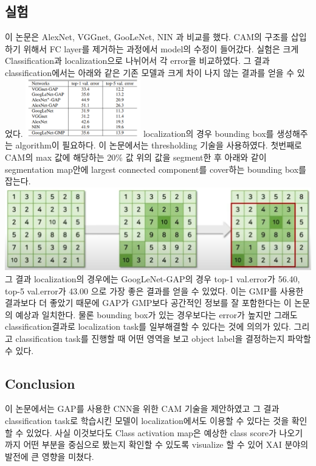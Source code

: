 \documentclass[extendedabs]{bmvc2k}
\begin{document}
 \subsection{실험}
 \quad 이 논문은 AlexNet, VGGnet, GooLeNet, NIN 과 비교를 했다. CAM의 구조를 삽입하기 위해서 FC layer를 제거하는 과정에서 model의 수정이 들어갔다. 실험은
  크게 Classification과 localization으로 나뉘어서 각 error을 비교하였다. 그 결과 classification에서는 아래와 같은 기존 모델과 크게 차이 나지 않는 결과를 얻을 수 있었다.  
  \newline  \includegraphics[width=5cm]{images/02_CAM.PNG}
  \newline localization의 경우 bounding box를 생성해주는 algorithm이 필요하다. 이 논문에서는 thresholding 기술을 사용하였다. 
  첫번째로 CAM의 max 값에 해당하는 20\% 값 위의 값을 segment한 후 아래와 같이\cite{youtubeCAM} segmentation map안에 largest connected component를 cover하는 bounding box를 잡는다. 
  \newline  \includegraphics[width=\linewidth]{images/03_CAM.PNG}
  그 결과 localization의 경우에는 GoogLeNet-GAP의 경우 top-1 val.error가 56.40, top-5 val.error가 43.00 으로 가장 좋은 결과를 얻을 수 있었다. 이는 GMP를 사용한 결과보다 더 좋았기 때문에
  GAP가 GMP보다 공간적인 정보를 잘 포함한다는 이 논문의 예상과 일치한다. 물론 bounding box가 있는 경우보다는 error가 높지만 그래도 classification결과로 localization task를 일부해결할 수 있다는 것에 의의가 있다.
  그리고 classification task를 진행할 때 어떤 영역을 보고 object label을 결정하는지 파악할 수 있다.
  
  \subsection{Conclusion}
  \quad 이 논문에서는 GAP를 사용한 CNN을 위한 CAM 기술을 제안하였고 그 결과 classification task로 학습시킨 모델이 localization에서도 이용할 수 있다는 것을 확인할 수 있었다.
  사실 이것보다도 Class activation map은 예상한 class score가 나오기 까지 어떤 부분을 중심으로 봤는지 확인할 수 있도록 visualize 할 수 있어 XAI 분야의 발전에 큰 영향을 미쳤다.
\end{document}
